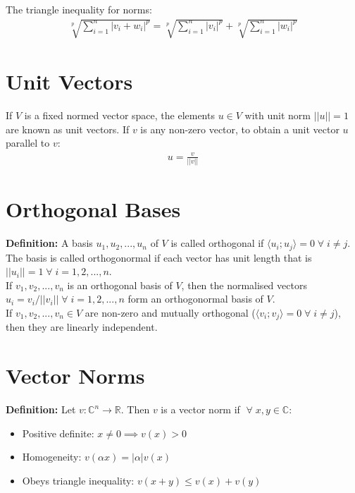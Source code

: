 \documentclass{article}
\newcommand{\real}{\mathbb{R}}
\newcommand{\cum}{\mathbb{C}}
\begin{document}
The triangle inequality for norms:
\begin{gather*}
  \sqrt[p]{\sum_{i = 1}^{n} |v_i + w_i|^p} =
  \sqrt[p]{\sum_{i = 1}^{n} |v_i|^p} +
  \sqrt[p]{\sum_{i = 1}^{n} |w_i|^p}
\end{gather*}

\section{Unit Vectors}
If $ V $ is a fixed normed vector space, the elements $ u \in V $
with unit norm $ ||u|| = 1 $ are known as unit vectors. If $ v $ is
any non-zero vector, to obtain a unit vector $ u $ parallel to $ v $:
\begin{gather*}
  u = \frac{v}{||v||}
\end{gather*}

\section{Orthogonal Bases}
\textbf{Definition:} A basis $ u_1, u_2, ..., u_n $ of $ V $ is called orthogonal if
$ \langle u_i; u_j \rangle = 0 \; \forall \; i \neq j $. The basis
is called orthogonormal if each vector has unit length that is
$ ||u_i|| = 1 \; \forall \; i = 1, 2, ..., n $. \\

If $ v_1, v_2, ..., v_n $ is an orthogonal basis of $ V $, then the
normalised vectors $ u_i = v_i / ||v_i|| \; \forall \; i = 1, 2,
..., n$ form an orthogonormal basis of $ V $. \\

If $ v_1, v_2, ..., v_n \in V $ are non-zero and mutually orthogonal
($ \langle v_i; v_j \rangle = 0 \; \forall \; i \neq j $), then they
are linearly independent.

\section{Vector Norms}
\textbf{Definition:} Let $ v: \cum^n \rightarrow \real $. Then $ v $ is
a vector norm if $ \; \forall \; x, y \in \cum $:
\begin{itemize}
  \item Positive definite: $ x \neq 0 \implies v(x) > 0 $
  \item Homogeneity: $ v(\alpha x) = |\alpha|v(x) $
  \item Obeys triangle inequality: $ v(x + y) \leq v(x) + v(y) $
\end{itemize}
\end{document}
